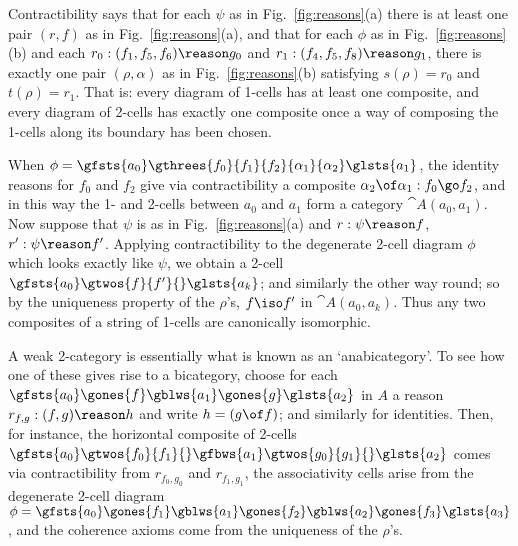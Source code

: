 Contractibility says that for each $\psi$ as in
Fig.~\ref{fig:reasons}(a) there is at least one pair $(r,f)$ as in
Fig.~\ref{fig:reasons}(a), and that for each $\phi$ as in
Fig.~\ref{fig:reasons}(b) and each $r_0: (f_1,f_5,f_6) \reason g_0$ and $r_1:
(f_4,f_5,f_8) \reason g_1$, there is exactly one pair $(\rho,\alpha)$ as in
Fig.~\ref{fig:reasons}(b) satisfying $s(\rho)=r_0$ and $t(\rho)=r_1$.  That
is: every diagram of 1-cells has at least one composite, and every diagram of
2-cells has exactly one composite once a way of composing the 1-cells
along its boundary has been chosen.

When $\phi = \gfsts{a_0} \gthrees{f_0}{f_1}{f_2}{\alpha_1}{\alpha_2}
\glsts{a_1}$, the identity reasons for $f_0$ and $f_2$ give via
contractibility a composite $\alpha_2 \of \alpha_1: f_0 \go f_2$, and in this
way the 1- and 2-cells between $a_0$ and $a_1$ form a category
$\cat{A}(a_0,a_1)$.  Now suppose that $\psi$ is as in
Fig.~\ref{fig:reasons}(a) and $r:\psi\reason f$, $r':\psi\reason f'$.
Applying contractibility to the degenerate 2-cell diagram $\phi$ which looks
exactly like $\psi$, we obtain a 2-cell
$\gfsts{a_0}\gtwos{f}{f'}{}\glsts{a_k}$; and similarly the other way round;
so by the uniqueness property of the $\rho$'s, $f\iso f'$ in
$\cat{A}(a_0,a_k)$.  Thus any two composites of a string of 1-cells are
canonically isomorphic.

A weak 2-category is essentially what is known as an `anabicategory'.  To see
how one of these gives rise to a bicategory, choose for each
$\gfsts{a_0}\gones{f}\gblws{a_1}\gones{g}\glsts{a_2}$ in $A$ a reason
$r_{f,g}: (f,g) \reason h$ and write $h=(g\of f)$; and similarly for
identities.  Then, for instance, the horizontal composite of 2-cells $
\gfsts{a_0} \gtwos{f_0}{f_1}{} \gfbws{a_1} \gtwos{g_0}{g_1}{} \glsts{a_2} $
comes via contractibility from $r_{f_0,g_0}$ and $r_{f_1,g_1}$, the
associativity cells arise from the degenerate 2-cell diagram $ \phi =
\gfsts{a_0} \gones{f_1}\gblws{a_1} \gones{f_2}\gblws{a_2}
\gones{f_3}\glsts{a_3} $, and the coherence axioms come from the uniqueness
of the $\rho$'s.





